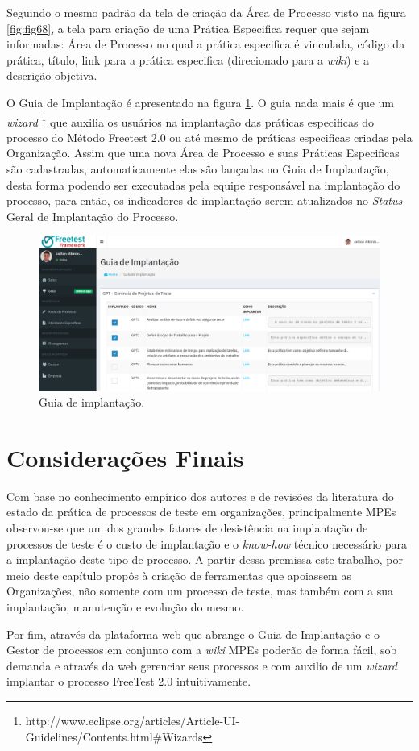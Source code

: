 Seguindo o mesmo padrão da tela de criação da Área de Processo visto na figura \ref{fig:fig68}, a tela para criação de uma Prática Especifica requer que sejam informadas: Área de Processo no qual a prática especifica é vinculada, código da prática, título, link para a prática especifica (direcionado para a \textit{wiki}) e a descrição objetiva.

O Guia de Implantação é apresentado na figura \ref{fig:fig611}. O guia nada mais é que um \textit{wizard} \footnote{http://www.eclipse.org/articles/Article-UI-Guidelines/Contents.html\#Wizards} que auxilia os usuários na implantação das práticas especificas do processo do Método Freetest 2.0 ou até mesmo de práticas especificas criadas pela Organização. Assim que uma nova Área de Processo e suas Práticas Especificas são cadastradas, automaticamente elas são lançadas no Guia de Implantação, desta forma podendo ser executadas pela equipe responsável na implantação do processo, para então, os indicadores de implantação serem atualizados no \textit{Status} Geral de Implantação do Processo.

\begin{figure}[H]
\centering
\includegraphics[width=.90\textwidth]{fig/figura611.png}
\caption{Guia de implantação.}
\label{fig:fig611}
\end{figure}


\section{Considerações Finais}
\label{sec:consideracoesfinaiscap6}

Com base no conhecimento empírico dos autores e de revisões da literatura do estado da prática de processos de teste em organizações, principalmente MPEs observou-se que um dos grandes fatores de desistência na implantação de processos de teste é o custo de implantação e o \textit{know-how} técnico necessário para a implantação deste tipo de processo. A partir dessa premissa este trabalho, por meio deste capítulo propôs à criação de ferramentas que apoiassem as Organizações, não somente com um processo de teste, mas também com a sua implantação, manutenção e evolução do mesmo. 

Por fim, através da plataforma web que abrange o Guia de Implantação e o Gestor de processos em conjunto com a \textit{wiki} MPEs poderão de forma fácil, sob demanda e através da web gerenciar seus processos e com auxilio de um \textit{wizard} implantar o processo FreeTest 2.0 intuitivamente. 
